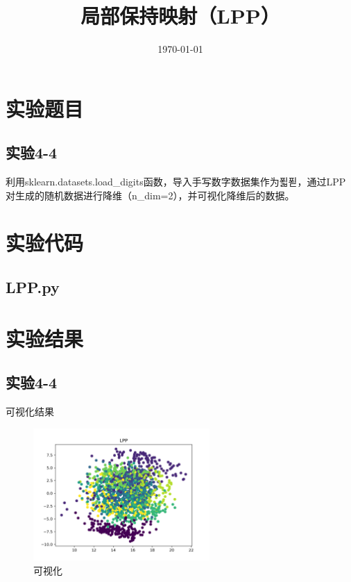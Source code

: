 \documentclass{../source/Experiment}
\title{局部保持映射（LPP）}
\date{\today}
\begin{document}
\makecover
\section{实验题目}
\subsection{实验4-4}
利用sklearn.datasets.load\_digits函数，导入手写数字数据集作为푋푇，通过LPP对生成的随机数据进行降维（n\_dim=2），并可视化降维后的数据。

\section{实验代码}
\subsection{LPP.py}



\section{实验结果}
\subsection{实验4-4}
可视化结果
\begin{figure}[H]
    \centering
    \includegraphics[width = 0.6\textwidth]{Part4/4-4.png}
    \caption{可视化}
\end{figure}
\end{document}
